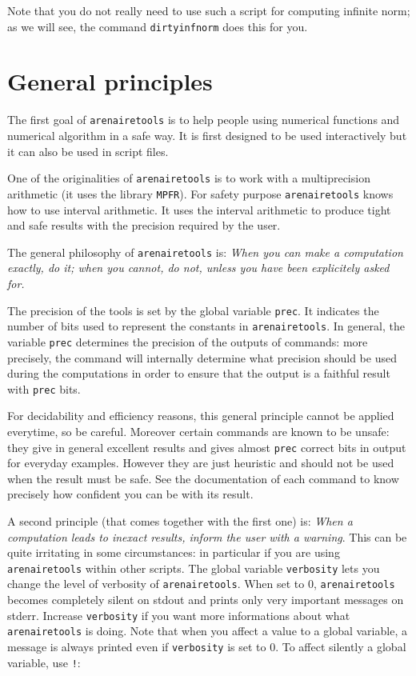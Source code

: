 \documentclass[a4paper]{article}
\newcommand{\com}[1]{\texttt{#1}}
\newcommand{\key}[1]{\texttt{#1}}
\newcommand{\arenairetools}{\texttt{arenairetools}\xspace}
\begin{document}
Note that you do not really need to use such a script for computing infinite norm; as we will see, the command \com{dirtyinfnorm} does this for you.

\section{General principles}
The first goal of \arenairetools is to help people using numerical functions and numerical algorithm in a safe way. It is first designed to be used interactively but it can also be used in script files.

One of the originalities of \arenairetools is to work with a multiprecision arithmetic (it uses the library \texttt{MPFR}). For safety purpose \arenairetools knows how to use interval arithmetic. It uses the interval arithmetic to produce tight and safe results with the precision required by the user.

The general philosophy of \arenairetools is: \emph{When you can make a computation exactly, do it; when you cannot, do not, unless you have been explicitely asked for.}

The precision of the tools is set by the global variable \key{prec}. It indicates the number of bits used to represent the constants in \arenairetools. In general, the variable \key{prec} determines the precision of the outputs of commands: more precisely, the command will internally determine what precision should be used during the computations in order to ensure that the output is a faithful result with \key{prec} bits.

For decidability and efficiency reasons, this general principle cannot be applied everytime, so be careful. Moreover certain commands are known to be unsafe: they give in general excellent results and gives almost \key{prec} correct bits in output for everyday examples. However they are just heuristic and should not be used when the result must be safe. See the documentation of each command to know precisely how confident you can be with its result.

A second principle (that comes together with the first one) is: \emph{When a computation leads to inexact results, inform the user with a warning}. This can be quite irritating in some circumstances: in particular if you are using \arenairetools within other scripts. The global variable \key{verbosity} lets you change the level of verbosity of \arenairetools. When set to $0$, \arenairetools becomes completely silent on stdout and prints only very important messages on stderr. Increase \key{verbosity} if you want more informations about what \arenairetools is doing. Note that when you affect a value to a global variable, a message is always printed even if \com{verbosity} is set to $0$. To affect silently a global variable, use \texttt{!}:
\end{document}
